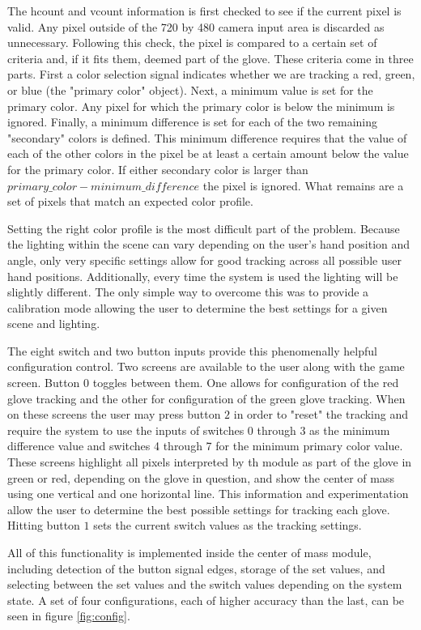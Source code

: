 The hcount and vcount information is first checked to see if the current pixel
is valid. Any pixel outside of the 720 by 480 camera input area is discarded as
unnecessary. Following this check, the pixel is compared to a certain set of
criteria and, if it fits them, deemed part of the glove. These criteria come in
three parts. First a color selection signal indicates whether we are tracking a
red, green, or blue (the "primary color" object). Next, a minimum value is set
for the primary color. Any pixel for which the primary color is below the
minimum is ignored. Finally, a minimum difference is set for each of the two
remaining "secondary" colors is defined. This minimum difference requires that
the value of each of the other colors in the pixel be at least a certain amount
below the value for the primary color. If either secondary color is larger than
$primary\_color - minimum\_difference$ the pixel is ignored. What remains are a
set of pixels that match an expected color profile.

Setting the right color profile is the most difficult part of the problem.
Because the lighting within the scene can vary depending on the user's hand
position and angle, only very specific settings allow for good tracking across
all possible user hand positions. Additionally, every time the system is used
the lighting will be slightly different. The only simple way to overcome this
was to provide a calibration mode allowing the user to determine the best
settings for a given scene and lighting.

The eight switch and two button inputs provide this phenomenally helpful
configuration control. Two screens are available to the user along with the game
screen. Button $0$ toggles between them. One allows for configuration of the red
glove tracking and the other for configuration of the green glove tracking. When
on these screens the user may press button $2$ in order to "reset" the
tracking and require the system to use the inputs of switches 0 through 3 as the
minimum difference value and switches 4 through 7 for the minimum primary color
value. These screens highlight all pixels interpreted by th module as part of
the glove in green or red, depending on the glove in question, and show the
center of mass using one vertical and one horizontal line. This information and
experimentation allow the user to determine the best possible settings for
tracking each glove. Hitting button $1$ sets the current switch values as the
tracking settings.

All of this functionality is implemented inside the center of mass module,
including detection of the button signal edges, storage of the set values, and
selecting between the set values and the switch values depending on the system
state. A set of four configurations, each of higher accuracy than the last, can
be seen in figure \ref{fig:config}.

